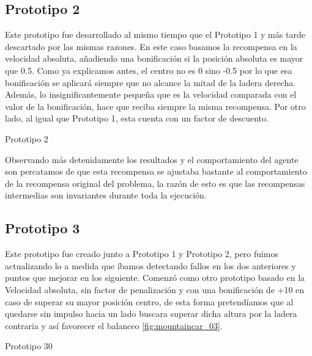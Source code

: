  

 

\subsection{Prototipo 2}
Este prototipo fue desarrollado al mismo tiempo que el Prototipo 1 y más tarde descartado por las mismas razones.
En este caso basamos la recompensa en la velocidad absoluta, añadiendo una bonificación si la posición absoluta es mayor que 0.5. Como ya explicamos antes, el centro no es 0 sino -0.5 por lo que esa bonificación se aplicará siempre que no alcance la mitad de la ladera derecha. Además, lo insignificantemente pequeña que es la velocidad comparada con el valor de la bonificación, hace que reciba siempre la misma recompensa. Por otro lado, al igual que Prototipo 1, esta cuenta con un factor de descuento.  

        {Prototipo 2}

Observando más detenidamente los resultados y el comportamiento del agente son percatamos de que esta recompensa se ajustaba bastante al comportamiento de la recompensa original del problema, la razón de esto es que las recompensas intermedias son invariantes durante toda la ejecución. 

\subsection{Prototipo 3}
 Este prototipo fue creado junto a Prototipo 1 y Prototipo 2, pero fuimos actualizando lo a medida que íbamos detectando fallos en los dos anteriores y puntos que mejorar en los siguiente.
 Comenzó como otro prototipo basado en la Velocidad absoluta, sin factor de penalización y con una bonificación de +10 en caso de superar su mayor posición centro, de esta forma pretendíamos que al quedarse sin impulso hacia un lado buscara superar dicha altura por la ladera contraria y así favorecer el balanceo \ref{fig:mountaincar_03}. 

        {Prototipo 30}  

